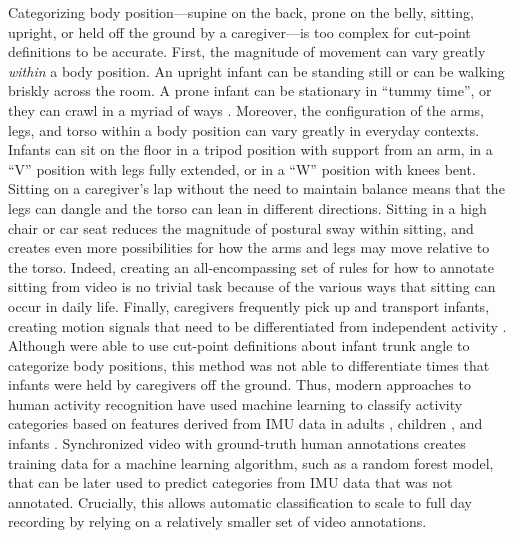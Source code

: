 \documentclass[
  man]{apa6}
\begin{document}
Categorizing body position---supine on the back, prone on the belly, sitting, upright, or held off the ground by a caregiver---is too complex for cut-point definitions to be accurate. First, the magnitude of movement can vary greatly \emph{within} a body position. An upright infant can be standing still or can be walking briskly across the room. A prone infant can be stationary in ``tummy time'', or they can crawl in a myriad of ways \autocite{AdolphVereijken1998}. Moreover, the configuration of the arms, legs, and torso within a body position can vary greatly in everyday contexts. Infants can sit on the floor in a tripod position with support from an arm, in a ``V'' position with legs fully extended, or in a ``W'' position with knees bent. Sitting on a caregiver's lap without the need to maintain balance means that the legs can dangle and the torso can lean in different directions. Sitting in a high chair or car seat reduces the magnitude of postural sway within sitting, and creates even more possibilities for how the arms and legs may move relative to the torso. Indeed, creating an all-encompassing set of rules for how to annotate sitting from video is no trivial task because of the various ways that sitting can occur in daily life. Finally, caregivers frequently pick up and transport infants, creating motion signals that need to be differentiated from independent activity \autocite{KwonZavos2019,PatelShi2019}. Although \textcite{GreenspanCunha2021} were able to use cut-point definitions about infant trunk angle to categorize body positions, this method was not able to differentiate times that infants were held by caregivers off the ground. Thus, modern approaches to human activity recognition have used machine learning to classify activity categories based on features derived from IMU data in adults \autocite{Preece2009,Arif2015}, children \autocite{NamPark2013,RenDing2016,StewartNarayanan2018}, and infants \autocite{YaoPlotz2019,FranchakScott2021,AiraksinenRasanen2020}. Synchronized video with ground-truth human annotations creates training data for a machine learning algorithm, such as a random forest model, that can be later used to predict categories from IMU data that was not annotated. Crucially, this allows automatic classification to scale to full day recording by relying on a relatively smaller set of video annotations.
\end{document}
